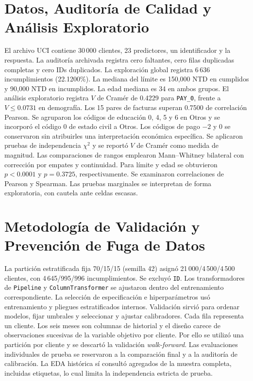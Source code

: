 \documentclass[11pt, a4paper]{article}
\begin{document}
\section{Datos, Auditoría de Calidad y Análisis Exploratorio}
El archivo UCI contiene 30\,000 clientes, 23 predictores, un identificador y la respuesta. La auditoría archivada registra cero faltantes, cero filas duplicadas completas y cero IDs duplicados. La exploración global registra 6\,636 incumplimientos (22.1200\%). La mediana del límite es 150,000 NTD en cumplidos y 90,000 NTD en incumplidos. La edad mediana es 34 en ambos grupos. El análisis exploratorio registra $V$ de Cramér de 0.4229 para \texttt{PAY\_0}, frente a $V\le 0.0731$ en demografía. Los 15 pares de facturas superan 0.7500 de correlación Pearson. Se agruparon los códigos de educación 0, 4, 5 y 6 en Otros y se incorporó el código 0 de estado civil a Otros. Los códigos de pago $-2$ y $0$ se conservaron sin atribuirles una interpretación económica específica. Se aplicaron pruebas de independencia $\chi^2$ y se reportó $V$ de Cramér como medida de magnitud. Las comparaciones de rangos emplearon Mann--Whitney bilateral con corrección por empates y continuidad. Para límite y edad se obtuvieron $p < 0.0001$ y $p = 0.3725$, respectivamente. Se examinaron correlaciones de Pearson y Spearman. Las pruebas marginales se interpretan de forma exploratoria, con cautela ante celdas escasas.
\section{Metodología de Validación y Prevención de Fuga de Datos}
La partición estratificada fija 70/15/15 (semilla 42) asignó 21\,000/4\,500/4\,500 clientes, con 4\,645/995/996 incumplimientos. Se excluyó \texttt{ID}. Los transformadores de \texttt{Pipeline} y \texttt{ColumnTransformer} se ajustaron dentro del entrenamiento correspondiente. La selección de especificación e hiperparámetros usó entrenamiento y pliegues estratificados internos. Validación sirvió para ordenar modelos, fijar umbrales y seleccionar y ajustar calibradores. Cada fila representa un cliente. Los seis meses son columnas de historial y el diseño carece de observaciones sucesivas de la variable objetivo por cliente. Por ello se utilizó una partición por cliente y se descartó la validación \emph{walk-forward}. Las evaluaciones individuales de prueba se reservaron a la comparación final y a la auditoría de calibración. La EDA histórica sí consultó agregados de la muestra completa, incluidas etiquetas, lo cual limita la independencia estricta de prueba.
\end{document}

